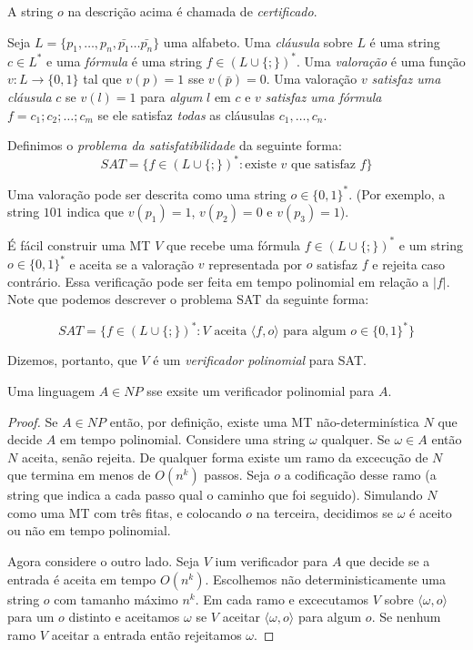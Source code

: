 A string $o$ na descrição acima é chamada de {\em certificado}.

\begin{example}
  Seja $L = \{p_1, \dots, p_n, \bar{p_1} \dots \bar{p_n}\}$ uma alfabeto.
  Uma {\em cláusula} sobre $L$ é uma string $c \in L^*$ e uma {\em fórmula} é uma string $f \in (L\cup\{;\})^*$.
  Uma {\em valoração} é uma função $v : L \to \{0,1\}$ tal que $v(p) = 1$ sse $v(\bar{p}) = 0$.
  Uma valoração $v$ {\em satisfaz uma cláusula} $c$ se $v(l) = 1$ para {\em algum} $l$ em $c$ e $v$ {\em satisfaz uma fórmula} $f = c_1;c_2;\dots;c_m$ se ele satisfaz {\em todas} as cláusulas $c_1, \dots, c_n$.

  Definimos o {\em problema da satisfatibilidade} da seguinte forma:
  \begin{displaymath}
    SAT = \{f \in (L \cup \{;\})^*: \textrm{existe $v$ que satisfaz $f$}\}
  \end{displaymath}

  Uma valoração pode ser descrita como uma string $o \in \{0,1\}^*$.
  (Por exemplo, a string $101$ indica que $v(p_1) = 1$, $v(p_2) = 0$ e $v(p_3) = 1$).

  É fácil construir uma MT $V$ que recebe uma fórmula $f \in (L \cup \{;\})^*$ e um string $o \in \{0,1\}^*$ e aceita se a valoração $v$ representada por $o$ satisfaz $f$ e rejeita caso contrário.
  Essa verificação pode ser feita em tempo polinomial em relação a $|f|$.
  Note que podemos descrever o problema SAT da seguinte forma:

  \begin{displaymath}
    SAT = \{f \in (L \cup \{;\})^*: \textrm{$V$ aceita $\langle f, o \rangle$ para algum $o \in \{0,1\}^*$}\}
  \end{displaymath}

  Dizemos, portanto, que $V$ é um {\em verificador polinomial} para SAT.
\end{example}

\begin{theorem}
  Uma linguagem $A \in NP$ sse exsite um verificador polinomial para $A$.
\end{theorem}
\begin{proof}
  Se $A \in NP$ então, por definição, existe uma MT não-determinística $N$ que decide $A$ em tempo polinomial.
  Considere uma string $\omega$ qualquer.
  Se $\omega \in A$ então $N$ aceita, senão rejeita.
  De qualquer forma existe um ramo da excecução de $N$ que termina em menos de $O(n^k)$ passos.
  Seja $o$ a codificação desse ramo (a string que indica a cada passo qual o caminho que foi seguido).
  Simulando $N$ como uma MT com três fitas, e colocando $o$ na terceira, decidimos se $\omega$ é aceito ou não em tempo polinomial.

  Agora considere o outro lado.
  Seja $V$ ium verificador para $A$ que decide se a entrada é aceita em tempo $O(n^k)$.
  Escolhemos não deterministicamente uma string $o$ com tamanho máximo $n^k$.
  Em cada ramo e excecutamos $V$ sobre $\langle \omega, o \rangle$ para um $o$ distinto e aceitamos $\omega$ se $V$ aceitar $\langle \omega, o \rangle$ para algum $o$.
  Se nenhum ramo $V$ aceitar a entrada então rejeitamos $\omega$.
\end{proof}

